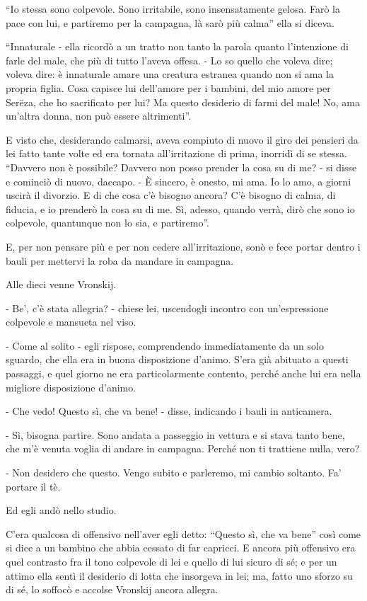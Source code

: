 ``Io stessa sono colpevole. Sono irritabile, sono insensatamente gelosa. Farò la pace con lui, e partiremo per la campagna, là sarò più calma'' ella si diceva. 

``Innaturale - ella ricordò a un tratto non tanto la parola quanto l'intenzione di farle del male, che più di tutto l'aveva offesa. - Lo so quello che voleva dire; voleva dire: è innaturale amare una creatura estranea quando non si ama la propria figlia. Cosa capisce lui dell'amore per i bambini, del mio amore per Serëza, che ho sacrificato per lui? Ma questo desiderio di farmi del male! No, ama un'altra donna, non può essere altrimenti''. 

E visto che, desiderando calmarsi, aveva compiuto di nuovo il giro dei pensieri da lei fatto tante volte ed era tornata all'irritazione di prima, inorridì di se stessa. ``Davvero non è possibile? Davvero non posso prender la cosa su di me? - si disse e cominciò di nuovo, daccapo. - È sincero, è onesto, mi ama. Io lo amo, a giorni uscirà il divorzio. E di che cosa c'è bisogno ancora? C'è bisogno di calma, di fiducia, e io prenderò la cosa su di me. Sì, adesso, quando verrà, dirò che sono io colpevole, quantunque non lo sia, e partiremo''. 

E, per non pensare più e per non cedere all'irritazione, sonò e fece portar dentro i bauli per mettervi la roba da mandare in campagna. 

Alle dieci venne Vronskij. 

\label{xxiv-5} 

- Be', c'è stata allegria? - chiese lei, uscendogli incontro con un'espressione colpevole e mansueta nel viso. 

- Come al solito - egli rispose, comprendendo immediatamente da un solo sguardo, che ella era in buona disposizione d'animo. S'era già abituato a questi passaggi, e quel giorno ne era particolarmente contento, perché anche lui era nella migliore disposizione d'animo. 

- Che vedo! Questo sì, che va bene! - disse, indicando i bauli in anticamera. 

- Sì, bisogna partire. Sono andata a passeggio in vettura e si stava tanto bene, che m'è venuta voglia di andare in campagna. Perché non ti trattiene nulla, vero? 

- Non desidero che questo. Vengo subito e parleremo, mi cambio soltanto. Fa' portare il tè. 

Ed egli andò nello studio. 

C'era qualcosa di offensivo nell'aver egli detto: ``Questo sì, che va bene'' così come si dice a un bambino che abbia cessato di far capricci. E ancora più offensivo era quel contrasto fra il tono colpevole di lei e quello di lui sicuro di sé; e per un attimo ella sentì il desiderio di lotta che insorgeva in lei; ma, fatto uno sforzo su di sé, lo soffocò e accolse Vronskij ancora allegra. 

